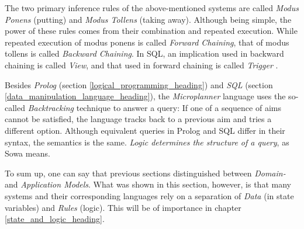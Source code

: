 The two primary inference rules of the above-mentioned systems are called
\emph{Modus Ponens} (putting) and \emph{Modus Tollens} (taking away). Although
being simple, the power of these rules comes from their combination and
repeated execution. While repeated execution of modus ponens is called
\emph{Forward Chaining}, that of modus tollens is called \emph{Backward Chaining}.
In SQL, an implication used in backward chaining is called \emph{View}, and that
used in forward chaining is called \emph{Trigger} \cite{sowa}.

Besides \emph{Prolog} (section \ref{logical_programming_heading}) and \emph{SQL}
(section \ref{data_manipulation_language_heading}), the \emph{Microplanner}
language \cite[p. 157]{sowa} uses the so-called \emph{Backtracking} technique
to answer a query: If one of a sequence of aims cannot be satisfied, the language
tracks back to a previous aim and tries a different option. Although equivalent
queries in Prolog and SQL differ in their syntax, the semantics is the same.
\textit{Logic determines the structure of a query}, as Sowa \cite[p. 159]{sowa}
means.

To sum up, one can say that previous sections distinguished between \emph{Domain-}
and \emph{Application Models}. What was shown in this section, however, is that
many systems and their corresponding languages rely on a separation of \emph{Data}
(in state variables) and \emph{Rules} (logic). This will be of importance in
chapter \ref{state_and_logic_heading}.
